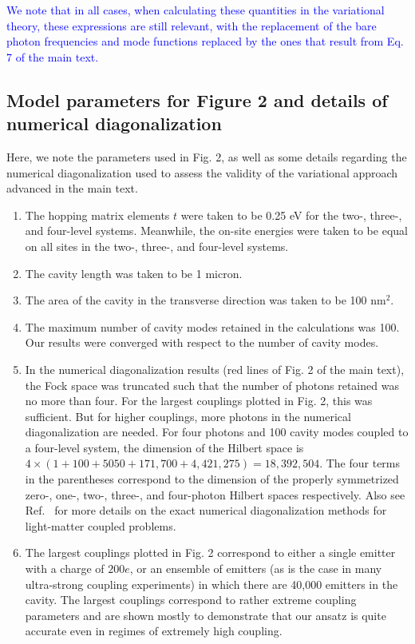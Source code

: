 \documentclass[aps,prb,onecolumn,preprint,
	groupedaddress,superscriptaddress,
	amsfonts,amssymb,amsmath,floatfix,
	citeautoscript]{revtex4-1}
\begin{document}
\textcolor{blue}{We note that in all cases, when calculating these quantities in the variational theory, these expressions are still relevant, with the replacement of the bare photon frequencies and mode functions replaced by the ones that result from Eq. 7 of the main text.}

\subsection{Model parameters for Figure 2 and details of numerical diagonalization}

Here, we note the parameters used in Fig. 2, as well as some details regarding the numerical diagonalization used to assess the validity of the variational approach advanced in the main text.

\begin{enumerate}
\item{The hopping matrix elements $t$ were taken to be 0.25 eV for the two-, three-, and four-level systems. Meanwhile, the on-site energies were taken to be equal on all sites in the two-, three-, and four-level systems.}
\item{The cavity length was taken to be 1 micron.}
\item{The area of the cavity in the transverse direction was taken to be 100 nm$^2$.}
\item{The maximum number of cavity modes retained in the calculations was 100. Our results were converged with respect to the number of cavity modes.}
\item{In the numerical diagonalization results (red lines of Fig. 2 of the main text), the Fock space was truncated such that the number of photons retained was no more than four. For the largest couplings plotted in Fig. 2, this was sufficient. But for higher couplings, more photons in the numerical diagonalization are needed. For four photons and 100 cavity modes coupled to a four-level system, the dimension of the Hilbert space is  $4\times \left( 1 + 100 + 5050 + 171,700 + 4,421,275 \right) = 18,392,504$. The four terms in the parentheses correspond to the dimension of the properly symmetrized zero-, one-, two-, three-, and four-photon Hilbert spaces respectively. Also see Ref.~\cite{flick2017} for more details on the exact numerical diagonalization methods for light-matter coupled problems.}
\item{The largest couplings plotted in Fig. 2 correspond to either a single emitter with a charge of $200e$, or an ensemble of emitters (as is the case in many ultra-strong coupling experiments) in which there are 40,000 emitters in the cavity. The largest couplings correspond to rather extreme coupling parameters and are shown mostly to demonstrate that our ansatz is quite accurate even in regimes of extremely high coupling.}
\end{enumerate}
\end{document}
